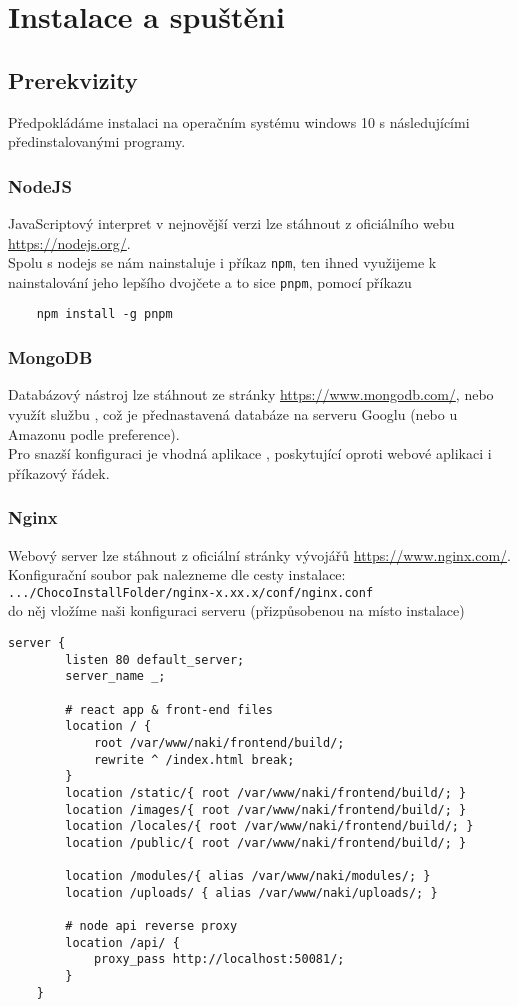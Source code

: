 \chapter{Instalace a spuštěni}

\section{Prerekvizity}
Předpokládáme instalaci na operačním systému windows 10 s následujícími 
předinstalovanými programy.
\subsection{NodeJS}
JavaScriptový interpret v nejnovější verzi lze stáhnout z oficiálního
webu \url{https://nodejs.org/}.\\
Spolu s nodejs se nám nainstaluje i příkaz \texttt{npm}, ten ihned využijeme
k nainstalování jeho lepšího dvojčete a to sice \texttt{pnpm}, pomocí
příkazu
\begin{lstlisting}
	npm install -g pnpm
\end{lstlisting}

\subsection{MongoDB}
Databázový nástroj lze stáhnout ze stránky \url{https://www.mongodb.com/},
nebo využít službu , což je přednastavená databáze
na serveru Googlu (nebo u Amazonu podle preference).\\
Pro snazší konfiguraci je vhodná aplikace , poskytující
oproti webové aplikaci i příkazový řádek.

\subsection{Nginx}
Webový server lze stáhnout z oficiální stránky vývojářů \url{https://www.nginx.com/}.
Konfigurační soubor pak nalezneme dle cesty instalace:\\
\texttt{.../ChocoInstallFolder/nginx-x.xx.x/conf/nginx.conf}\\
do něj vložíme naši konfiguraci serveru (přizpůsobenou na místo instalace)
\begin{lstlisting}[keywordstyle=\ttfamily]
	server {
		listen 80 default_server;
		server_name _;

		# react app & front-end files
		location / {
			root /var/www/naki/frontend/build/;
			rewrite ^ /index.html break;
		}
		location /static/{ root /var/www/naki/frontend/build/; }
		location /images/{ root /var/www/naki/frontend/build/; }
		location /locales/{ root /var/www/naki/frontend/build/; }
		location /public/{ root /var/www/naki/frontend/build/; }

		location /modules/{ alias /var/www/naki/modules/; }
		location /uploads/ { alias /var/www/naki/uploads/; }

		# node api reverse proxy
		location /api/ {
			proxy_pass http://localhost:50081/;
		}
	}
\end{lstlisting}


